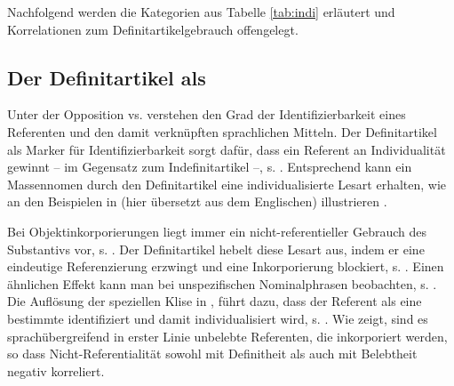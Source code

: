 Nachfolgend werden die Kategorien aus Tabelle \ref{tab:indi} erläutert und Korrelationen zum Definitartikelgebrauch offengelegt. 

\subsection{Der Definitartikel als } \label{sec:individualisierer} 

Unter der Opposition  vs.  verstehen \textcite{Hopper1980} den Grad der Identifizierbarkeit eines Referenten und den damit verknüpften sprachlichen Mitteln. Der Definitartikel als Marker für Identifizierbarkeit sorgt dafür, dass ein Referent an Individualität gewinnt -- im Gegensatz zum Indefinitartikel --, s. . Entsprechend kann ein Massennomen durch den Definitartikel eine individualisierte Lesart erhalten, wie \textcite[253]{Hopper1980} an den Beispielen in  (hier übersetzt aus dem Englischen) illustrieren \parencite[vgl. auch][257]{Leiss2000}.

\begin{exe}
	\ex \label{ex:Referentialität} 
\end{exe}

\begin{exe}
	\ex \label{ex:bier} 
\end{exe} 
\noindent
Bei Objektinkorporierungen liegt immer ein nicht-referentieller Gebrauch des Substantivs vor, s.  \parencite[vgl. u.a.][]{Mithun1984}. Der Definitartikel hebelt diese Lesart aus, indem er eine eindeutige Referenzierung erzwingt und eine Inkorporierung blockiert, s. .  Einen ähnlichen Effekt kann man bei unspezifischen Nominalphrasen beobachten, s. . Die Auflösung der speziellen Klise in , führt dazu, dass der Referent als eine bestimmte  identifiziert und damit individualisiert wird, s. . Wie \textcite[169]{Croft2006} zeigt, sind es sprachübergreifend in erster Linie unbelebte Referenten, die inkorporiert werden, so dass Nicht-Referentialität sowohl mit Definitheit als auch mit Belebtheit negativ korreliert.

\begin{exe}
	\ex \label{ex:inkorp}
	\begin{xlist}
		\ex \label{ex:rad} 
		\ex \label{ex:dasrad} 
	\end{xlist}
\end{exe} 


